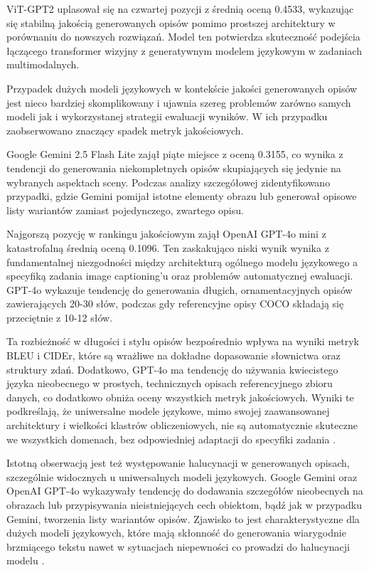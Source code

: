 ViT-GPT2 uplasował się na czwartej pozycji z średnią oceną 0.4533, wykazując się stabilną jakością generowanych opisów
pomimo prostszej architektury w porównaniu do nowszych rozwiązań. Model ten potwierdza skuteczność podejścia łączącego
transformer wizyjny z generatywnym modelem językowym w zadaniach multimodalnych.

Przypadek dużych modeli językowych w kontekście jakości generowanych opisów jest nieco bardziej skomplikowany i ujawnia szereg problemów
zarówno samych modeli jak i wykorzystanej strategii ewaluacji wyników.
W ich przypadku zaobserwowano znaczący spadek metryk jakościowych. 

Google Gemini 2.5 Flash Lite zajął piąte miejsce
z oceną 0.3155, co wynika z tendencji do generowania niekompletnych opisów skupiających się jedynie na wybranych aspektach sceny.
Podczas analizy szczegółowej zidentyfikowano przypadki, gdzie Gemini pomijał istotne elementy obrazu lub generował
opisowe listy wariantów zamiast pojedynczego, zwartego opisu.

Najgorszą pozycję w rankingu jakościowym zajął OpenAI GPT-4o mini z katastrofalną średnią oceną 0.1096.
Ten zaskakująco niski wynik wynika z fundamentalnej niezgodności między architekturą ogólnego modelu językowego
a specyfiką zadania image captioning'u oraz problemów automatycznej ewaluacji. GPT-4o wykazuje tendencję do generowania długich, ornamentacyjnych opisów
zawierających 20-30 słów, podczas gdy referencyjne opisy COCO składają się przeciętnie z 10-12 słów.

Ta rozbieżność w długości i stylu opisów bezpośrednio wpływa na wyniki metryk BLEU i CIDEr, które są wrażliwe
na dokładne dopasowanie słownictwa oraz struktury zdań. Dodatkowo, GPT-4o ma tendencję do używania kwiecistego języka
nieobecnego w prostych, technicznych opisach
referencyjnego zbioru danych, co dodatkowo obniża oceny wszystkich metryk jakościowych. 
Wyniki te podkreślają, że uniwersalne modele językowe, mimo swojej zaawansowanej architektury i wielkości klastrów obliczeniowych,
nie są automatycznie skuteczne we wszystkich domenach, bez odpowiedniej adaptacji do specyfiki zadania \cite{transfer_learning_limitations_kenton2019}.

Istotną obserwacją jest też występowanie halucynacji w generowanych opisach, szczególnie widocznych u uniwersalnych modeli językowych.
Google Gemini oraz OpenAI GPT-4o wykazywały tendencję do dodawania szczegółów nieobecnych na obrazach
lub przypisywania nieistniejących cech obiektom, bądź jak w przypadku Gemini, tworzenia listy wariantów opisów. 
Zjawisko to jest charakterystyczne dla dużych modeli językowych,
które mają skłonność do generowania wiarygodnie brzmiącego tekstu nawet w sytuacjach niepewności co prowadzi do halucynacji modelu \cite{hallucination_ji2023}.

